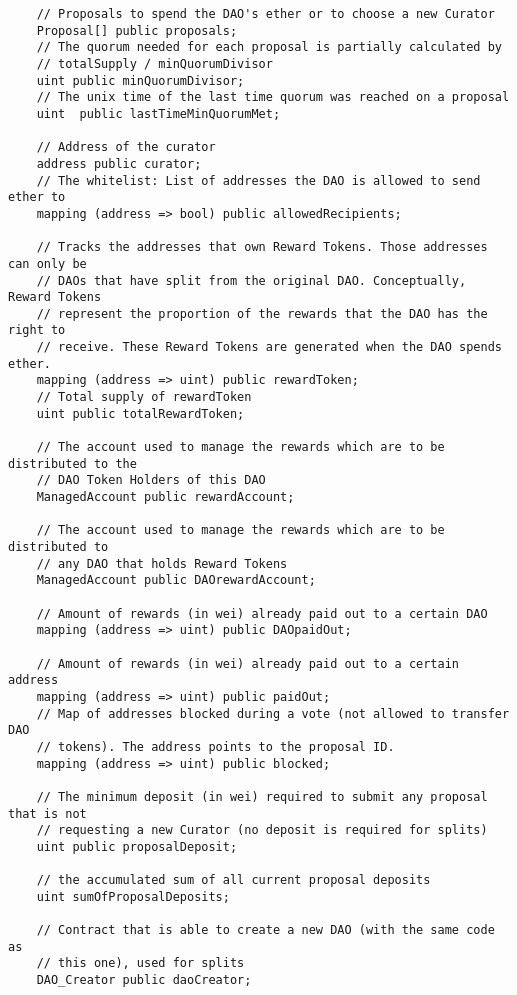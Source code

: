 \documentclass[9pt,oneside]{amsart}
\begin{document}
\begin{appendix}
\begin{verbatim}
    // Proposals to spend the DAO's ether or to choose a new Curator
    Proposal[] public proposals;
    // The quorum needed for each proposal is partially calculated by
    // totalSupply / minQuorumDivisor
    uint public minQuorumDivisor;
    // The unix time of the last time quorum was reached on a proposal
    uint  public lastTimeMinQuorumMet;

    // Address of the curator
    address public curator;
    // The whitelist: List of addresses the DAO is allowed to send ether to
    mapping (address => bool) public allowedRecipients;

    // Tracks the addresses that own Reward Tokens. Those addresses can only be
    // DAOs that have split from the original DAO. Conceptually, Reward Tokens
    // represent the proportion of the rewards that the DAO has the right to
    // receive. These Reward Tokens are generated when the DAO spends ether.
    mapping (address => uint) public rewardToken;
    // Total supply of rewardToken
    uint public totalRewardToken;

    // The account used to manage the rewards which are to be distributed to the
    // DAO Token Holders of this DAO
    ManagedAccount public rewardAccount;

    // The account used to manage the rewards which are to be distributed to
    // any DAO that holds Reward Tokens
    ManagedAccount public DAOrewardAccount;

    // Amount of rewards (in wei) already paid out to a certain DAO
    mapping (address => uint) public DAOpaidOut;

    // Amount of rewards (in wei) already paid out to a certain address
    mapping (address => uint) public paidOut;
    // Map of addresses blocked during a vote (not allowed to transfer DAO
    // tokens). The address points to the proposal ID.
    mapping (address => uint) public blocked;

    // The minimum deposit (in wei) required to submit any proposal that is not
    // requesting a new Curator (no deposit is required for splits)
    uint public proposalDeposit;

    // the accumulated sum of all current proposal deposits
    uint sumOfProposalDeposits;

    // Contract that is able to create a new DAO (with the same code as
    // this one), used for splits
    DAO_Creator public daoCreator;


\end{verbatim}
\end{appendix}
\end{document}
